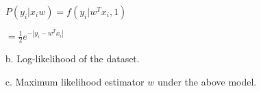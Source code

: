 \documentclass[12pt]{report}
\begin{document}
\begin{enumerate}
  $P(y_i|x_iw)=f(y_i|w^Tx_i,1)$

  $= \frac{1}{2}e^{-|y_i-w^Tx_i|}$
\item[b.] Log-likelihood of the dataset.
\item[c.] Maximum likelihood estimator $w$ under the above model.








\end{enumerate}
\end{document}
